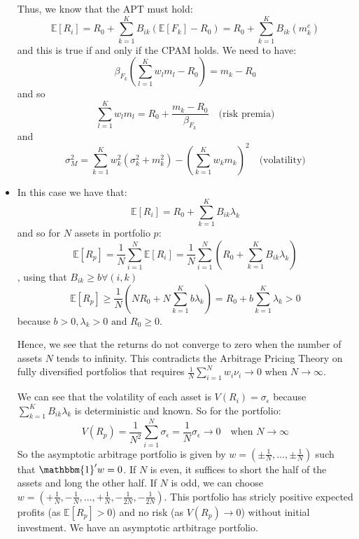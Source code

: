 \documentclass[10pt]{article}
\newcommand{\Ebb}{\mathbb{E}}
\newenvironment{exercise}[2][Exercise]{\begin{trivlist}
  \item[\hskip \labelsep {\bfseries #1}\hskip \labelsep {\bfseries #2.}]}{\end{trivlist}}
\begin{document}
\begin{exercise}{1}
\begin{itemize}
    Thus, we know that the APT must hold: 
    $$ \Ebb[R_i] = R_0 + \sum_{k=1}^K B_{ik}(\Ebb[F_k] - R_0) = R_0 + \sum_{k=1}^K B_{ik}(m_k^e)$$ and this is true if and only if the CPAM holds.
    We need to have: $$ \beta_{F_k}(\sum_{l=1}^K w_lm_l - R_0) = m_k - R_0$$ and so $$ \sum_{l=1}^K w_lm_l = R_0 + \frac{m_k-R_0}{\beta_{F_k}}\quad \text{(risk premia)}$$
    and $$ \sigma_M^2 = \sum_{k=1}^K w_k^2(\sigma_k^2 + m_k^2)-(\sum_{k=1}^Kw_km_k)^2 \quad \text{(volatility)}$$
    \item In this case we have that: 
    $$ \Ebb[R_i] = R_0 + \sum_{k=1}^K B_{ik}\lambda_k$$ and so for $N$ assets in portfolio $p$:
    $$ \Ebb[R_p] = \frac{1}{N}\sum_{i=1}^N\Ebb[R_i] = \frac{1}{N}\sum_{i=1}^N(R_0 + \sum_{k=1}^K B_{ik}\lambda_k)$$, using that $B_{ik}\geq b \forall (i,k)$
    $$ \Ebb[R_p] \geq \frac{1}{N}\left(NR_0 + N\sum_{k=1}^K b\lambda_k\right) = R_0 + b\sum_{k=1}^K\lambda_k > 0 $$ because $b> 0, \lambda_k >0 \text{ and } R_0 \geq 0$.

    Hence, we see that the returns do not converge to zero when the number of assets $N$ tends to infinity. This contradicts the Arbitrage Pricing Theory on fully diversified portfolios that requires $ \frac{1}{N}\sum_{i=1}^Nw_i\nu_i \rightarrow 0$ when $N \rightarrow \infty$.  

    We can see that the volatility of each asset is $V(R_i) = \sigma_{\epsilon}$ because $\sum_{k=1}^KB_{ik}\lambda_k$ is deterministic and known. 
    So for the portfolio: 
    $$ V(R_p) = \frac{1}{N^2}\sum_{i=1}^N\sigma_{\epsilon} = \frac{1}{N}\sigma_\epsilon \rightarrow 0 \quad \text{when } N \rightarrow \infty$$
    So the asymptotic arbitrage portfolio is given by $w = (\pm\frac{1}{N},\dots,\pm\frac{1}{N})$ such that $\mathbbm{1}'w = 0$. If $N$ is even, it suffices to short the half of the assets and long the other half. If $N$ is odd, we can choose $w = (+\frac{1}{N},-\frac{1}{N},\dots,+\frac{1}{N},-\frac{1}{2N},-\frac{1}{2N})$.
    This portfolio has stricly positive expected profits (as $\Ebb[R_p] > 0$) and no risk (as $V(R_p)\rightarrow 0$) without initial investment. We have an asymptotic artbitrage portfolio. 
  \end{itemize}
	
\end{exercise}
\end{document}
